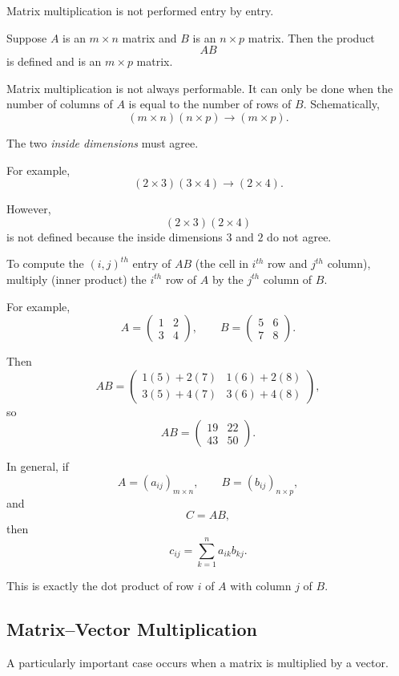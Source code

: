 \documentclass[11pt]{article}
\theoremstyle{definition}
\theoremstyle{plain}
\theoremstyle{remark}
\begin{document}
Matrix multiplication is not performed entry by entry.

Suppose $A$ is an $m\times n$ matrix and $B$ is an $n\times p$
matrix. Then the product
\[
AB
\]
is defined and is an $m\times p$ matrix.

Matrix multiplication is not always performable. It can only be done when the number of columns of $A$ is equal to the number of rows of $B$. Schematically,
\[
{
(m\times n)(n\times p)
\longrightarrow
(m\times p).
}
\]

The two \emph{inside dimensions} must agree.

For example,
\[
(2\times3)(3\times4)
\longrightarrow
(2\times4).
\]

However,
\[
(2\times3)(2\times4)
\]
is not defined because the inside dimensions $3$ and $2$ do not
agree.

To compute the $(i,j)^{th}$ entry of  $AB$ (the cell in $i^{th}$ row and $j^{th}$ column), multiply (inner product) the $i^{th}$ row of $A$
by the $j^{th}$ column of $B$.

For example,
\[
A=
\begin{pmatrix}
1&2\\
3&4
\end{pmatrix},
\qquad
B=
\begin{pmatrix}
5&6\\
7&8
\end{pmatrix}.
\]

Then
\[
AB
=
\begin{pmatrix}
1(5)+2(7) & 1(6)+2(8)\\
3(5)+4(7) & 3(6)+4(8)
\end{pmatrix},
\]
so
\[
AB
=
\begin{pmatrix}
19&22\\
43&50
\end{pmatrix}.
\]

In general, if
\[
A=(a_{ij})_{m\times n},
\qquad
B=(b_{ij})_{n\times p},
\]
and
\[
C=AB,
\]
then
\[
{
c_{ij}
=
\sum_{k=1}^{n}a_{ik}b_{kj}.
}
\]

This is exactly the dot product of row $i$ of $A$
with column $j$ of $B$.


\subsection*{Matrix--Vector Multiplication}

A particularly important case occurs when a matrix is multiplied by
a vector.
\end{document}
